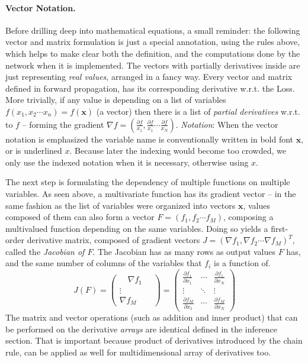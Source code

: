 \paragraph{Vector Notation.}
Before drilling deep into mathematical equations, a small reminder: the following vector and matrix formulation is just a special annotation, 
using the rules above, which helps to make clear both the definition, and the computations done by the network when it is implemented. 
The vectors with partially derivatives inside are just representing \emph{real values}, arranged in a fancy way.
Every vector and matrix defined in forward propagation, has its corresponding derivative w.r.t. the Loss.
More trivially, if any value is depending on a list of variables $f(x_1, x_2 \cdots x_n) = f(\mathbf{x})$ (a vector) then there is a list of \emph{partial derivatives} w.r.t. to $f$ -- forming the gradient $\nabla f = \left(\frac{\partial f}{x_1}, \frac{\partial f}{x_1} \cdots \frac{\partial f}{x_N}\right)$. 
\emph{Notation}: When the vector notation is emphasized the variable name is conventionally written in bold font $\mathbf{x}$, or is underlined \underline{$x$}.
Because later the indexing would become too crowded, we only use the indexed notation when it is necessary, otherwise using $x$.

The next step is formulating the dependency of multiple functions on multiple variables.
As seen above, a multivariate function has its gradient vector --
in the same fashion as the list of variables were organized into vectors $\mathbf{x}$, values composed of them can also form a vector $F = (f_1, f_2 \cdots f_M)$, composing a multivalued function depending on the same variables.
Doing so yields a first-order derivative matrix, composed of gradient vectors $J=(\nabla f_1, \nabla f_2 \cdots \nabla f_M)^T$, called the \emph{Jacobian of $F$}.
The Jacobian has as many rows as output values $F$ has, and the same number of columns of the variables that $f_i$ is a function of.
\begin{equation}\label{eq:jacobian}
    J(F) = 
    \begin{pmatrix}
    \quad \nabla f_1 \quad \\ 
    \vdots \\ 
    \nabla f_M
    \end{pmatrix} 
    =
    \begin{pmatrix}
    \frac{\partial f_1}{\partial x_1} & \cdots & \frac{\partial f_1}{\partial x_N} \\ 
    \vdots & \ddots & \vdots \\ 
    \frac{\partial f_M}{\partial x_1} & \cdots & \frac{\partial f_M}{\partial x_N}
    \end{pmatrix} 
\end{equation}
The matrix and vector operations (such as addition and inner product) that can be performed on the derivative \emph{arrays} are identical defined in the inference section. That is important because product of derivatives introduced by the chain rule, can be applied as well for multidimensional array of derivatives too.

